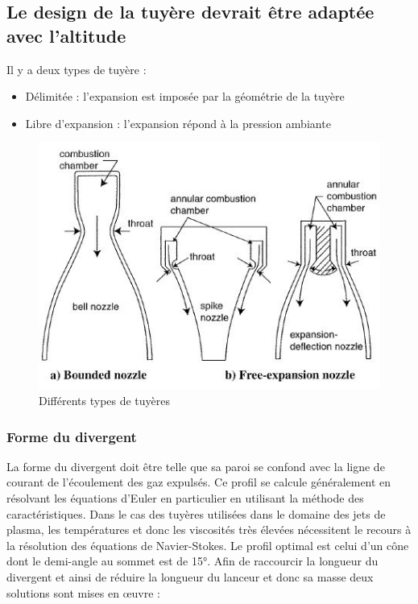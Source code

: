 \documentclass{report}
\begin{document}
\subsection{Le design de la tuyère devrait être adaptée avec l'altitude}

Il y a deux types de tuyère :
\begin{itemize}
    \item Délimitée : l'expansion est imposée par la géométrie de la tuyère
    \item Libre d'expansion : l'expansion répond à la pression ambiante
\end{itemize}

\begin{figure}[h!]
    \centering
    \includegraphics[scale=0.7]{47.JPG}
    \caption{Différents types de tuyères}
    \label{47}
\end{figure}

\subsubsection{Forme du divergent}

La forme du divergent doit être telle que sa paroi se confond avec la ligne de courant de l'écoulement des gaz expulsés. Ce profil se calcule généralement en résolvant les équations d'Euler en particulier en utilisant la méthode des caractéristiques. Dans le cas des tuyères utilisées dans le domaine des jets de plasma, les températures et donc les viscosités très élevées nécessitent le recours à la résolution des équations de Navier-Stokes. Le profil optimal est celui d'un cône dont le demi-angle au sommet est de 15°. Afin de raccourcir la longueur du divergent et ainsi de réduire la longueur du lanceur et donc sa masse deux solutions sont mises en œuvre :
\end{document}
